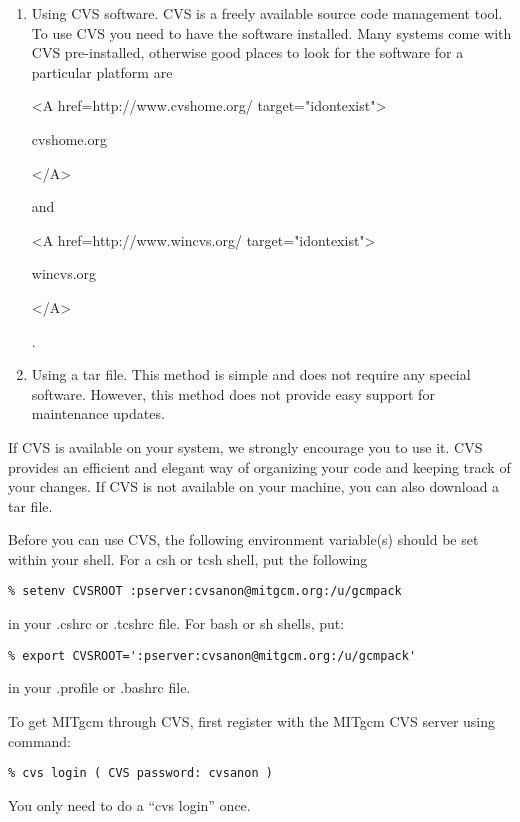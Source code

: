 \begin{enumerate}
\item Using CVS software. CVS is a freely available source code management
tool. To use CVS you need to have the software installed. Many systems
come with CVS pre-installed, otherwise good places to look for
the software for a particular platform are
\begin{rawhtml} <A href=http://www.cvshome.org/ target="idontexist"> \end{rawhtml}
cvshome.org
\begin{rawhtml} </A> \end{rawhtml}
and
\begin{rawhtml} <A href=http://www.wincvs.org/ target="idontexist"> \end{rawhtml}
wincvs.org
\begin{rawhtml} </A> \end{rawhtml}
.

\item Using a tar file. This method is simple and does not
require any special software. However, this method does not
provide easy support for maintenance updates.

\end{enumerate}

If CVS is available on your system, we strongly encourage you to use it. CVS
provides an efficient and elegant way of organizing your code and keeping
track of your changes. If CVS is not available on your machine, you can also
download a tar file.

Before you can use CVS, the following environment variable(s) should
be set within your shell.  For a csh or tcsh shell, put the following 
\begin{verbatim}
% setenv CVSROOT :pserver:cvsanon@mitgcm.org:/u/gcmpack
\end{verbatim}
in your .cshrc or .tcshrc file.  For bash or sh shells, put:
\begin{verbatim}
% export CVSROOT=':pserver:cvsanon@mitgcm.org:/u/gcmpack'
\end{verbatim}
in your .profile or .bashrc file.


To get MITgcm through CVS, first register with the MITgcm CVS server
using command:
\begin{verbatim}
% cvs login ( CVS password: cvsanon )
\end{verbatim}
You only need to do a ``cvs login'' once.

